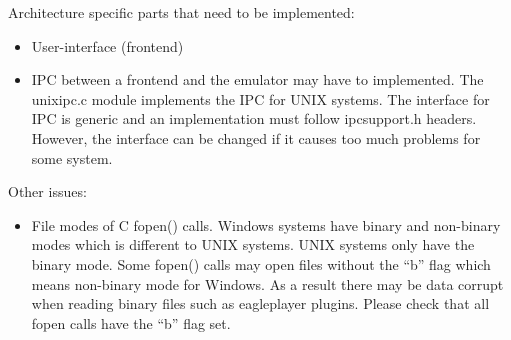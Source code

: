 \documentclass{article}
\begin{document}
Architecture specific parts that need to be implemented:
\begin{itemize}
\item User-interface (frontend)
\item IPC between a frontend and the emulator
  may have to implemented. The unixipc.c module implements the IPC for UNIX
  systems. The interface for IPC is generic and an implementation must
  follow ipcsupport.h headers. However, the interface can be changed if it
  causes too much problems for some system.
\end{itemize}

Other issues:
\begin{itemize}
\item File modes of C fopen() calls. Windows systems have binary and
  non-binary modes which is different to UNIX systems. UNIX systems only
  have the binary mode. Some fopen() calls may open files without the ``b''
  flag which means non-binary mode for Windows. As a result there may be
  data corrupt when reading binary files such as eagleplayer plugins. Please
  check that all fopen calls have the ``b'' flag set.
\end{itemize}
\end{document}

